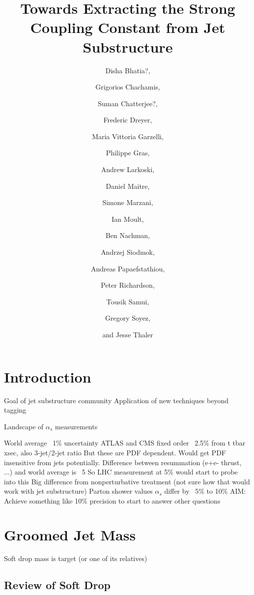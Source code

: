 \documentclass[11pt,letterpaper]{article}
\begin{document}
\title{Towards Extracting the Strong Coupling Constant from Jet Substructure }

\author[a]{Disha Bhatia?,}
\author[a]{Grigorios Chachamis,}
\author[a]{Suman Chatterjee?,}
\author[a]{Frederic Dreyer,}
\author[a]{Maria Vittoria Garzelli,}
\author[a]{Philippe Gras,}
\author[a]{Andrew Larkoski,}
\author[a]{Daniel Maitre,}
\author[a]{Simone Marzani, }
\author[a]{Ian Moult,}
\author[a]{Ben Nachman,}
\author[a]{Andrzej Siodmok,}
\author[a]{Andreas Papaefstathiou,}
\author[a]{Peter Richardson,}
\author[a]{Tousik Samui,}
\author[a]{Gregory Soyez,}
\author[a]{and Jesse Thaler}



\maketitle

\section{Introduction}

Goal of jet substructure community
Application of new techniques beyond tagging

Landscape of $\alpha_s$ measurements

World average ~1\% uncertainty
ATLAS and CMS fixed order ~2.5\% from t tbar xsec, also 3-jet/2-jet ratio
	But these are PDF dependent.
	Would get PDF insensitive from jets potentially.
Difference between resummation (e+e- thrust, ...) and world average is ~5%
	So LHC measurement at 5\% would start to probe into this
	Big difference from nonperturbative treatment
	(not sure how that would work with jet substructure)
Parton shower values $\alpha_s$ differ by ~5\% to 10\%
AIM:  Achieve something like 10\% precision to start to answer other questions

\section{Groomed Jet Mass}

Soft drop mass is target (or one of its relatives)

\subsection{Review of Soft Drop}
\end{document}
